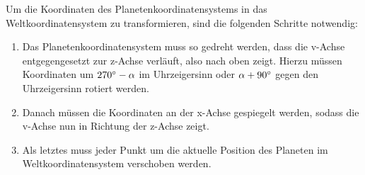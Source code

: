 \documentclass[a4paper,10pt,DIV=14]{scrartcl}
\begin{document}
Um die Koordinaten des Planetenkoordinatensystems in das Weltkoordinatensystem zu transformieren, sind die folgenden Schritte notwendig:
\begin{enumerate}[itemsep=0pt]
\item Das Planetenkoordinatensystem muss so gedreht werden, dass die v-Achse entgegengesetzt zur z-Achse verläuft, also nach oben zeigt. Hierzu müssen Koordinaten um $270\degree - \alpha$ im Uhrzeigersinn oder $\alpha + 90\degree$ gegen den Uhrzeigersinn rotiert werden.
\item Danach müssen die Koordinaten an der x-Achse gespiegelt werden, sodass die v-Achse nun in Richtung der z-Achse zeigt.
\item Als letztes muss jeder Punkt um die aktuelle Position des Planeten im Weltkoordinatensystem verschoben werden.
\end{enumerate}
\end{document}
